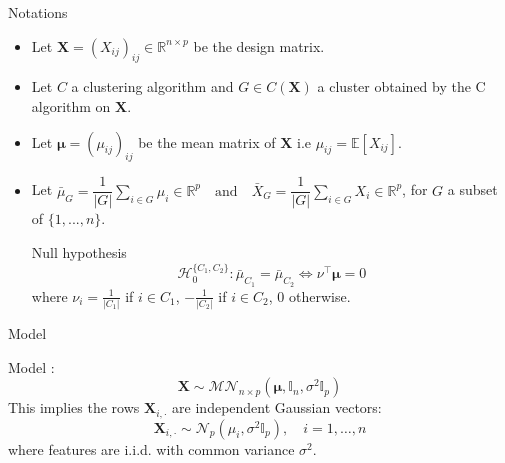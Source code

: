 \documentclass{beamer}
\begin{document}
\begin{frame}{Notations}
  \begin{itemize}
  \item Let $\mathbf{X} = (X_{ij})_{ij} \in \mathbb{R}^{n \times p}$ be the design matrix.
    \vspace{0.9em}
  \item Let $C$ a clustering algorithm and $G \in C(\mathbf{X})$ a cluster obtained by the C algorithm on $\mathbf{X}$.
    \vspace{0.9em}
  \item Let $\boldsymbol{\mu} = (\mu_{ij})_{ij}$ be the mean matrix of $\mathbf{X}$ i.e $\mu_{ij} = \mathbb{E}[X_{ij}]$.
    \vspace{0.9em}
\item Let $\bar{\mu}_G = \dfrac{1}{|G|} \displaystyle\sum_{i \in G} \mu_i \in \mathbb{R}^p\quad\text{and}\quad\bar{X}_G = \dfrac{1}{|G|} \displaystyle\sum_{i \in G} X_i \in \mathbb{R}^p$, for $G$ a subset of $\{1,...,n\}$.
  \vspace{0.5em}
  \begin{block}{Null hypothesis}
\begin{equation*}
    \mathcal{H}_0^{\{C_1,C_2\}} : \bar{\mu}_{C_1} = \bar{\mu}_{C_2} \iff \nu^\top\boldsymbol{\mu} = 0
  \end{equation*}
  \vspace{0.2em}
  where $\nu_i = \frac{1}{|C_1|}$ if $i \in C_1$, $-\frac{1}{|C_2|}$ if $i \in C_2$, $0$ otherwise.
  \end{block}

\end{itemize}
\end{frame}

\begin{frame}{Model}

\begin{block}{Model :}
  \begin{equation*}
    \mathbf{X} \sim \mathcal{MN}_{n\times p}(\boldsymbol{\mu}, \mathbb{I}_n, \sigma^2\mathbb{I}_p)
  \end{equation*}
  \vspace{0.2em}
  \small
  This implies the rows $\mathbf{X}_{i, \cdot}$ are independent Gaussian vectors:
  \begin{equation*}
    \mathbf{X}_{i, \cdot} \sim \mathcal{N}_p(\mu_i, \sigma^2\mathbb{I}_p), \quad i=1, \dots, n
  \end{equation*}
  where features are i.i.d. with common variance $\sigma^2$.
\end{block}

  \end{frame}
\end{document}
